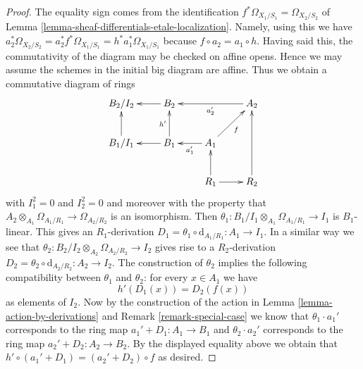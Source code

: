 \begin{proof}
The equality sign comes from the identification
$f^*\Omega_{X_1/S_1} = \Omega_{X_2/S_2}$ of
Lemma \ref{lemma-sheaf-differentials-etale-localization}.
Namely, using this we have
$a_2^*\Omega_{X_2/S_2} = a_2^*f^*\Omega_{X_1/S_1} =
h^*a_1^*\Omega_{X_1/S_1}$ because $f \circ a_2 = a_1 \circ h$.
Having said this, the commutativity of the diagram may be checked
on affine opens. Hence we may assume the schemes in the initial
big diagram are affine. Thus we obtain a commutative diagram of rings
$$
\xymatrix{
B_2/I_2 & B_2 \ar[l] & &
A_2 \ar[ll]^{a_2'} \\
B_1/I_1 \ar[u] & B_1 \ar[u]^{h'} \ar[l] & A_1 \ar[l]^{a_1'} \ar[ru]_f &
\\
& & R_1 \ar[r] \ar[u] & R_2 \ar[uu]
}
$$
with $I_1^2 = 0$ and $I_2^2 = 0$ and moreover with the property that
$A_2 \otimes_{A_1} \Omega_{A_1/R_1} \to \Omega_{A_2/R_2}$ is an
isomorphism. Then $\theta_1 : B_1/I_1 \otimes_{A_1} \Omega_{A_1/R_1} \to I_1$
is $B_1$-linear. This gives an $R_1$-derivation
$D_1 = \theta_1 \circ \text{d}_{A_1/R_1} : A_1 \to I_1$.
In a similar way we see that
$\theta_2 : B_2/I_2 \otimes_{A_2} \Omega_{A_2/R_2} \to I_2$
gives rise to a $R_2$-derivation
$D_2 = \theta_2 \circ \text{d}_{A_2/R_2} : A_2 \to I_2$.
The construction of $\theta_2$ implies the following compatibility between
$\theta_1$ and $\theta_2$: for every $x \in A_1$ we have
$$
h'(D_1(x)) = D_2(f(x))
$$
as elements of $I_2$. Now by the construction of the action in
Lemma \ref{lemma-action-by-derivations}
and
Remark \ref{remark-special-case}
we know that $\theta_1 \cdot a_1'$ corresponds to the ring map
$a_1' + D_1 : A_1 \to B_1$ and $\theta_2 \cdot a_2'$ corresponds
to the ring map $a_2' + D_2 : A_2 \to B_2$. By the displayed equality
above we obtain that $h' \circ (a_1' + D_1) = (a_2' + D_2) \circ f$
as desired.
\end{proof}

